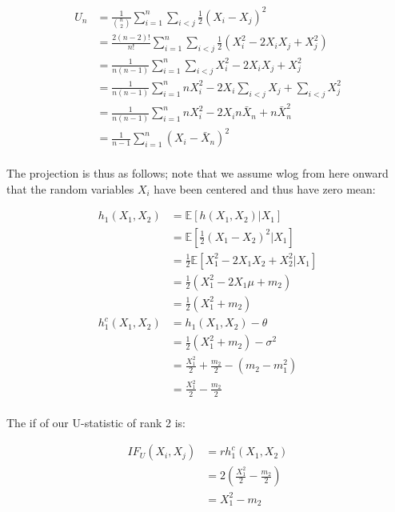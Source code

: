 \documentclass{report}
\begin{document}
\begin{equation}\label{eq:ex-lst-u-statistic-variance}
    \begin{aligned}
        U_n
          &= \frac{1}{\binom{n}{2}} \sum_{i=1}^n \sum_{i<j} \frac{1}{2} (X_i - X_j)^2 \\
          &= \frac{2(n-2)!}{n!} \sum_{i=1}^n \sum_{i<j} \frac{1}{2} \left(X_i^2 - 2X_iX_j + X_j^2\right) \\
          &= \frac{1}{n(n-1)} \sum_{i=1}^n \sum_{i<j} X_i^2 - 2X_iX_j + X_j^2 \\
          &= \frac{1}{n(n-1)} \sum_{i=1}^n nX_i^2 -2X_i\sum_{i<j}X_j + \sum_{i<j}X_j^2 \\
          &= \frac{1}{n(n-1)} \sum_{i=1}^n nX_i^2 -2X_in\bar{X}_n + n\bar{X}_n^2 \\
          &= \frac{1}{n-1} \sum_{i=1}^n \left(X_i - \bar{X}_n\right)^2 \\
    \end{aligned}
\end{equation}

The projection is thus as follows; note that we assume \gls{wlog} from here onward that the random variables $X_i$ have been centered and thus have zero mean:

\begin{equation}\label{eq:ex-lst-u-statistic-variance-projection}
    \begin{aligned}
        h_1(X_1, X_2)
          &= \mathbb{E}[h(X_1, X_2)|X_1] \\
          &= \mathbb{E}\left[\frac{1}{2}(X_1 - X_2)^2|X_1\right] \\
          &= \frac{1}{2}\mathbb{E}\left[X_1^2 - 2X_1X_2 + X_2^2|X_1\right] \\
          &= \frac{1}{2} (X_1^2 -2X_1\mu + m_2) \\
          &= \frac{1}{2} (X_1^2 + m_2) \\
        h_1^c(X_1, X_2)
          &= h_1(X_1, X_2) - \theta \\
          &= \frac{1}{2} (X_1^2 + m_2) - \sigma^2 \\
          &= \frac{X_1^2}{2} + \frac{m_2}{2} - (m_2 - m_1^2) \\
          &= \frac{X_1^2}{2} - \frac{m_2}{2} \\
    \end{aligned}
\end{equation}

The \gls{if} of our U-statistic of rank 2 is:

\begin{equation}\label{eq:ex-lst-u-statistic-variance-if}
    \begin{aligned}
        IF_U(X_i, X_j)
          &= rh_1^c(X_1, X_2) \\
          &= 2 \left(\frac{X_1^2}{2} - \frac{m_2}{2}\right) \\
          &= X_1^2 - m_2 \\
    \end{aligned}
\end{equation}
\end{document}
